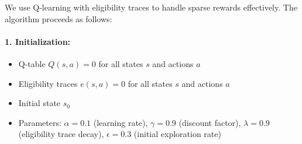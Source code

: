 We use Q-learning with eligibility traces to handle sparse rewards effectively. The algorithm proceeds as follows:

\paragraph*{1. Initialization:}
\begin{itemize}
    \item Q-table $Q(s, a) = 0$ for all states $s$ and actions $a$
    \item Eligibility traces $e(s, a) = 0$ for all states $s$ and actions $a$
    \item Initial state $s_0$ 
    \item Parameters: $\alpha = 0.1$ (learning rate), $\gamma = 0.9$ (discount factor), $\lambda = 0.9$ (eligibility trace decay), $\epsilon = 0.3$ (initial exploration rate)
\end{itemize}

